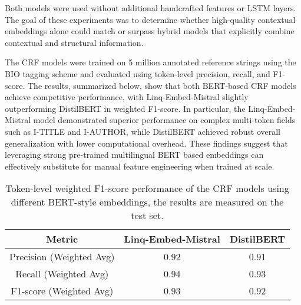 Both models were used without additional handcrafted features or LSTM layers. The goal of these experiments was to determine whether high-quality contextual embeddings alone could match or surpass hybrid models that explicitly combine contextual and structural information.

The CRF models were trained on 5 million annotated reference strings using the BIO tagging scheme and evaluated using token-level precision, recall, and F1-score.
The results, summarized below, show that both BERT-based CRF models achieve competitive performance, with Linq-Embed-Mistral slightly outperforming DistilBERT in weighted F1-score. In particular, the Linq-Embed-Mistral model demonstrated superior performance on complex multi-token fields such as I-TITLE and I-AUTHOR, while DistilBERT achieved robust overall generalization with lower computational overhead. These findings suggest that leveraging strong pre-trained multilingual BERT based embeddings can effectively substitute for manual feature engineering when trained at scale.

\begin{table}[h] 
    \centering 
    \begin{tabular}{|c|c|c|} 
        \hline 
        \textbf{Metric} & \textbf{Linq-Embed-Mistral} & \textbf{DistilBERT} \\ 
        \hline 
        Precision (Weighted Avg) & 0.92 & 0.91 \\
        Recall (Weighted Avg)    & 0.94 & 0.93 \\
        F1-score (Weighted Avg)  & 0.93 & 0.92 \\
        \hline 
    \end{tabular} 
    \caption[BERT-based CRF Token-level Performance]{Token-level weighted F1-score performance of the CRF models using different BERT-style embeddings, the results are measured on the test set.} 
    \label{tab:bert_crf_comparison} 
\end{table}


